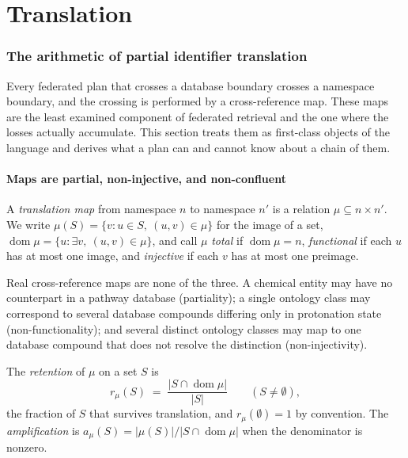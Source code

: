 \part{Translation}

\section{The arithmetic of partial identifier translation}
\label{sec:translation}

Every federated plan that crosses a database boundary crosses a namespace
boundary, and the crossing is performed by a cross-reference map. These maps
are the least examined component of federated retrieval and the one where the
losses actually accumulate. This section treats them as first-class objects of
the language and derives what a plan can and cannot know about a chain of them.

\subsection{Maps are partial, non-injective, and non-confluent}

\begin{definition}
\label{def:map}
A \emph{translation map} from namespace $n$ to namespace $n'$ is a relation
$\mu \subseteq n \times n'$. We write $\mu(S) = \{ v : u \in S,\ (u,v) \in \mu\}$
for the image of a set, $\operatorname{dom}\mu = \{u : \exists v,\ (u,v) \in \mu\}$,
and call $\mu$ \emph{total} if $\operatorname{dom}\mu = n$, \emph{functional}
if each $u$ has at most one image, and \emph{injective} if each $v$ has at most
one preimage.
\end{definition}

Real cross-reference maps are none of the three. A chemical entity may have no
counterpart in a pathway database (partiality); a single ontology class may
correspond to several database compounds differing only in protonation state
(non-functionality); and several distinct ontology classes may map to one
database compound that does not resolve the distinction (non-injectivity).

\begin{definition}[Retention]
\label{def:retention}
The \emph{retention} of $\mu$ on a set $S$ is
\[
r_\mu(S) \;=\; \frac{|S \cap \operatorname{dom}\mu|}{|S|}
\qquad (S \neq \emptyset),
\]
the fraction of $S$ that survives translation, and $r_\mu(\emptyset) = 1$ by
convention. The \emph{amplification} is
$a_\mu(S) = |\mu(S)| / |S \cap \operatorname{dom}\mu|$ when the denominator is
nonzero.
\end{definition}

